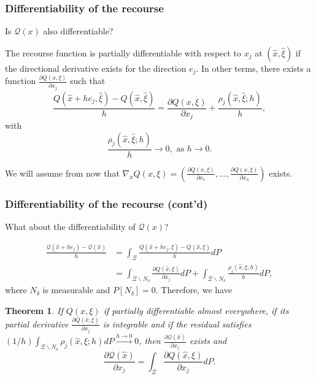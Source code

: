 \documentclass{beamer}
\newtheorem{theo}{Theorem}
\begin{document}
\begin{frame}
\frametitle{Differentiability of the recourse}

Is $\mathcal{Q}(x)$ also differentiable?

\mbox{}

The recourse function is partially differentiable with respect to $x_j$ at $(\hat{x}, \hat{\xi})$ if the directional derivative exists for the direction $e_j$.
In other terms, there exists a function $\frac{\partial Q(x,\xi)}{\partial x_j}$ such that
\[
\frac{Q(\hat{x}+he_j,\hat{\xi}) - Q(\hat{x},\hat{\xi})}{h} =
\frac{\partial Q(x,\xi)}{\partial x_j} + \frac{\rho_j (\hat{x},
  \hat{\xi}; h)}{h},
\]
with
\[
\frac{\rho_j (\hat{x}, \hat{\xi}; h)}{h} \rightarrow 0, \mbox{ as } h\rightarrow 0.
\]

\mbox{}

We will assume from now that $\nabla_x Q(x, \xi) = \left( \frac{\partial
  Q(x,\xi)}{\partial x_1},\ldots, \frac{\partial
  Q(x,\xi)}{\partial x_n} \right)$ exists.

\end{frame}

\begin{frame}
\frametitle{Differentiability of the recourse (cont'd)}

What about the differentiability of $\mathcal{Q}(x)$?

\begin{align*}
\frac{\mathcal{Q}(\hat{x}+he_j) -
  \mathcal{Q}(\hat{x})}{h} &=
\int_{\Xi}
\frac{Q(\hat{x}+he_j,\xi) - Q(\hat{x},\xi)}{h} dP \\
&= \int_{\Xi \backslash N_{\delta}} \frac{\partial
  Q(\hat{x},\xi)}{\partial x_j} dP+ \int_{\Xi \backslash N_{\delta}}
\frac{\rho_j (\hat{x}, \xi; h)}{h} dP,
\end{align*}
where $N_{\delta}$ is measurable and $P[N_{\delta}] = 0$.
Therefore, we have
\begin{theo}
If $Q(x,\xi)$ if partially differentiable almost everywhere, if its partial derivative 
$\frac{\partial Q(\hat{x},\xi)}{\partial x_j}$ is integrable and if the residual satisfies
$(1/h) \int_{\Xi \backslash N_{\delta}} \rho_j (\hat{x}, \xi; h) dP \overset{h \rightarrow 0}{\rightarrow } 0$, then $\frac{\partial \mathcal{Q}(\hat{x})}{\partial x_j}$ exists and
\[
 \frac{\partial \mathcal{Q}(\hat{x})}{\partial x_j} =
 \int_{\Xi} \frac{\partial Q(\hat{x},\xi)}{\partial x_j} dP.
\]
\end{theo}

\end{frame}
\end{document}
